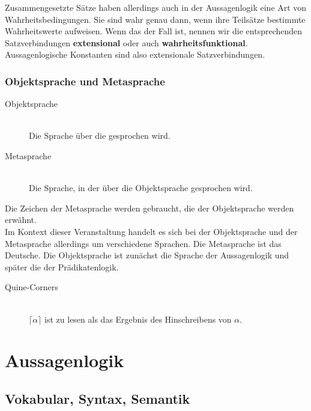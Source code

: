 \documentclass{scrartcl}
\begin{document}
Zusammengesetzte Sätze haben allerdings auch in der Aussagenlogik eine Art von Wahrheitsbedingungen. Sie sind wahr genau dann, wenn ihre Teilsätze bestimmte Wahrheitswerte aufweisen. Wenn das der Fall ist, nennen wir die entsprechenden Satzverbindungen \textbf{extensional} oder auch \textbf{wahrheitsfunktional}. Aussagenlogische Konstanten sind also extensionale Satzverbindungen.

\subsubsection{Objektsprache und Metasprache}

\begin{description}
	\item[Objektsprache] \mbox{}\\ Die Sprache über die gesprochen wird.
\end{description}

\begin{description}
	\item[Metasprache] \mbox{}\\ Die Sprache, in der über die Objektsprache gesprochen wird.
\end{description}

Die Zeichen der Metasprache werden gebraucht, die der Objektsprache werden erwähnt. \\

Im Kontext dieser Veranstaltung handelt es sich bei der Objektsprache und der Metasprache allerdings um verschiedene Sprachen. Die Metasprache ist das Deutsche. Die Objektsprache ist zunächst die Sprache der Aussagenlogik und später die der Prädikatenlogik.

\begin{description}
	\item[Quine-Corners] \mbox{}\\ $ \lceil \alpha \rceil $ ist zu lesen als das Ergebnis des Hinschreibens von $ \alpha $.
\end{description}

\section{Aussagenlogik}

\subsection{Vokabular, Syntax, Semantik}
\end{document}

